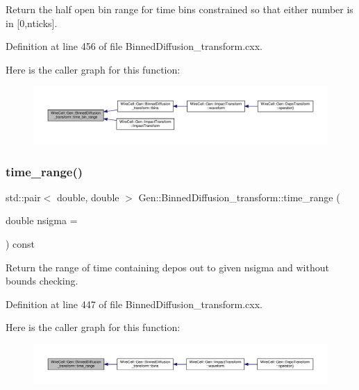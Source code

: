 Return the half open bin range for time bins constrained so that either number is in \mbox{[}0,nticks\mbox{]}. 

Definition at line 456 of file Binned\+Diffusion\+\_\+transform.\+cxx.

Here is the caller graph for this function\+:
\nopagebreak
\begin{figure}[H]
\begin{center}
\leavevmode
\includegraphics[width=350pt]{class_wire_cell_1_1_gen_1_1_binned_diffusion__transform_a8c66fd61a47999c36c8b00cafbe3fb87_icgraph}
\end{center}
\end{figure}
\mbox{\label{class_wire_cell_1_1_gen_1_1_binned_diffusion__transform_a85b39e7bc1fde6350ee84c8a3407cada}} 
\subsubsection{\texorpdfstring{time\+\_\+range()}{time\_range()}}
{\footnotesize\ttfamily std\+::pair$<$ double, double $>$ Gen\+::\+Binned\+Diffusion\+\_\+transform\+::time\+\_\+range (\begin{DoxyParamCaption}\item[{double}]{nsigma = {} }\end{DoxyParamCaption}) const}

Return the range of time containing depos out to given nsigma and without bounds checking. 

Definition at line 447 of file Binned\+Diffusion\+\_\+transform.\+cxx.

Here is the caller graph for this function\+:
\nopagebreak
\begin{figure}[H]
\begin{center}
\leavevmode
\includegraphics[width=350pt]{class_wire_cell_1_1_gen_1_1_binned_diffusion__transform_a85b39e7bc1fde6350ee84c8a3407cada_icgraph}
\end{center}
\end{figure}


